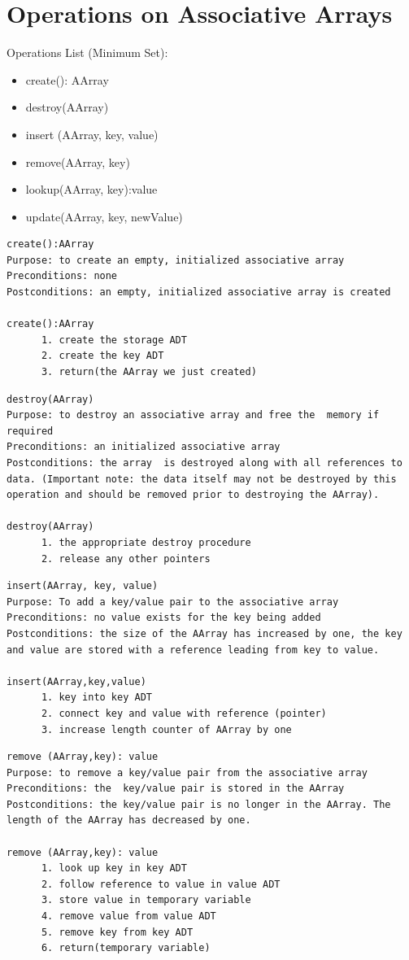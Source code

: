 \section{Operations on Associative Arrays}
Operations List (Minimum Set):
\begin{itemize}
	\item create(): AArray
	\item destroy(AArray)
	\item insert (AArray, key, value) 
	\item remove(AArray, key)
	\item lookup(AArray, key):value
	\item update(AArray, key, newValue)
\end{itemize}

\begin{lstlisting}
create():AArray
Purpose: to create an empty, initialized associative array
Preconditions: none
Postconditions: an empty, initialized associative array is created

create():AArray
      1. create the storage ADT
      2. create the key ADT
      3. return(the AArray we just created)
\end{lstlisting}


\begin{lstlisting}
destroy(AArray)
Purpose: to destroy an associative array and free the  memory if required
Preconditions: an initialized associative array
Postconditions: the array  is destroyed along with all references to data. (Important note: the data itself may not be destroyed by this operation and should be removed prior to destroying the AArray).

destroy(AArray)
      1. the appropriate destroy procedure
      2. release any other pointers
\end{lstlisting}

\begin{lstlisting}
insert(AArray, key, value)
Purpose: To add a key/value pair to the associative array
Preconditions: no value exists for the key being added
Postconditions: the size of the AArray has increased by one, the key and value are stored with a reference leading from key to value.

insert(AArray,key,value)
      1. key into key ADT 
      2. connect key and value with reference (pointer)
      3. increase length counter of AArray by one
\end{lstlisting}


\begin{lstlisting}
remove (AArray,key): value
Purpose: to remove a key/value pair from the associative array
Preconditions: the  key/value pair is stored in the AArray
Postconditions: the key/value pair is no longer in the AArray. The length of the AArray has decreased by one.

remove (AArray,key): value
      1. look up key in key ADT
      2. follow reference to value in value ADT
      3. store value in temporary variable
      4. remove value from value ADT
      5. remove key from key ADT
      6. return(temporary variable)
\end{lstlisting}


